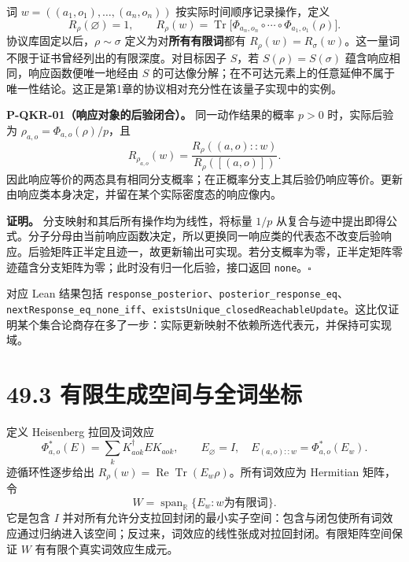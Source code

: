 \documentclass[
  11pt,
  oneside]{book}
\begin{document}
词 \(w=((a_1,o_1),\ldots,(a_n,o_n))\) 按实际时间顺序记录操作，定义 \[
R_\rho(\varnothing)=1,\qquad
R_\rho(w)=\operatorname{Tr}\bigl[\Phi_{a_n,o_n}\circ\cdots\circ\Phi_{a_1,o_1}(\rho)\bigr].
\] 协议库固定以后，\(\rho\sim\sigma\) 定义为对\textbf{所有有限词}都有
\(R_\rho(w)=R_\sigma(w)\)。这一量词不限于证书曾经列出的有限深度。对目标因子
\(S\)，若 \(S(\rho)=S(\sigma)\) 蕴含响应相同，响应函数便唯一地经由 \(S\)
的可达像分解；在不可达元素上的任意延伸不属于唯一性结论。这正是第1章的协议相对充分性在该量子实现中的实例。

\protect\hypertarget{p-qkr-01}{}{}

\textbf{P-QKR-01（响应对象的后验闭合）。} 同一动作结果的概率 \(p>0\)
时，实际后验为 \(\rho_{a,o}=\Phi_{a,o}(\rho)/p\)，且 \[
R_{\rho_{a,o}}(w)=\frac{R_\rho((a,o)::w)}{R_\rho([(a,o)])}.
\]
因此响应等价的两态具有相同分支概率；在正概率分支上其后验仍响应等价。更新由响应类本身决定，并留在某个实际密度态的响应像内。

\textbf{证明。} 分支映射和其后所有操作均为线性，将标量 \(1/p\)
从复合与迹中提出即得公式。分子分母由当前响应函数决定，所以更换同一响应类的代表态不改变后验响应。后验矩阵正半定且迹一，故更新输出可实现。若分支概率为零，正半定矩阵零迹蕴含分支矩阵为零；此时没有归一化后验，接口返回
\texttt{none}。\(\square\)

对应 Lean 结果包括
\texttt{response\_\allowbreak posterior}、\allowbreak \texttt{posterior\_\allowbreak response\_\allowbreak eq}、\allowbreak \texttt{next\allowbreak Response\_\allowbreak eq\_\allowbreak none\_\allowbreak iff}、\allowbreak \texttt{exists\allowbreak Unique\_\allowbreak closed\allowbreak Reachable\allowbreak Update}。这比仅证明某个集合论商存在多了一步：实际更新映射不依赖所选代表元，并保持可实现域。

\section{49.3 有限生成空间与全词坐标}

定义 Heisenberg 拉回及词效应 \[
\Phi_{a,o}^*(E)=\sum_kK_{aok}^{\dagger}EK_{aok},\qquad
E_{\varnothing}=I,\quad E_{(a,o)::w}=\Phi_{a,o}^*(E_w).
\] 迹循环性逐步给出
\(R_\rho(w)=\operatorname{Re}\operatorname{Tr}(E_w\rho)\)。所有词效应为
Hermitian 矩阵，令 \[
W=\operatorname{span}_{\mathbb R}\{E_w:w\text{为有限词}\}.
\] 它是包含 \(I\)
并对所有允许分支拉回封闭的最小实子空间：包含与闭包使所有词效应通过归纳进入该空间；反过来，词效应的线性张成对拉回封闭。有限矩阵空间保证
\(W\) 有有限个真实词效应生成元。

\protect\hypertarget{p-qkr-02}{}{}
\end{document}
